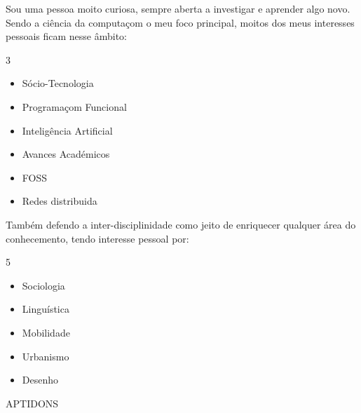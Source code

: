 \documentclass [a4paper] {extarticle} %
\newcommand{\sectionlinethickness} {0.5pt}
\newcommand{\leftcolumwidth} {0.15}
\newcommand{\rightcolumwidth}{0.84}
\newcommand {\sectiontitle}[1] {
  \vspace*{-10pt}
  \begin {flushleft}
  \begin {minipage}[c]{\leftcolumwidth\textwidth}
    \begin {flushright}
      \!\MakeUppercase {#1}
      \hspace* {10pt}
    \end {flushright}
  \end {minipage}
  \begin{minipage}[c]{\rightcolumwidth\textwidth}
    \begin {tikzpicture}[remember picture, overlay,blend mode=multiply]
      \draw [line width=\sectionlinethickness, black] (0,0) -- (15,0);
    \end {tikzpicture}
  \end{minipage}
  \end {flushleft}
}
\begin{document}
\begin {flushright}
\begin {minipage} [t] {\rightcolumwidth\textwidth}
  Sou uma pessoa moito curiosa, sempre aberta a investigar e aprender algo novo. Sendo a ciência da computaçom o meu foco principal, moitos dos meus interesses pessoais ficam nesse âmbito:

  \vspace {-8pt}
  \begin{multicols}{3}
    \begin {itemize} [noitemsep]
      \item Sócio-Tecnologia
      \item Programaçom Funcional
      \item Inteligência Artificial
      \item Avances Académicos
      \item FOSS
      \item Redes distribuida
    \end {itemize}
  \end{multicols}

  \vspace{-5pt}
  Também defendo a inter-disciplinidade como jeito de enriquecer qualquer área do conhecemento, tendo interesse pessoal por:

  \vspace{-8pt}
  \begin{multicols}{5}
    \begin {itemize} [noitemsep]
      \item Sociologia
      \item Linguística
      \item Mobilidade
      \item Urbanismo
      \item Desenho
    \end {itemize}
  \end{multicols}

\end {minipage}
\end {flushright}


\sectiontitle {aptidons}
\vspace{-15pt}
\end{document}
